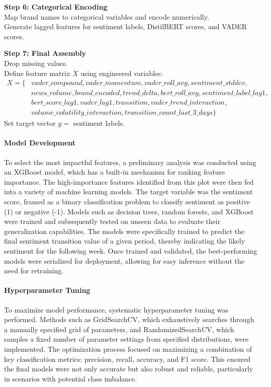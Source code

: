 \documentclass[pdflatex,sn-mathphys-num]{sn-jnl}%
\begin{document}
\begin{algorithm}[H]
\textbf{Step 6: Categorical Encoding} \\
\Indp
Map brand names to categorical variables and encode numerically. \\
Generate lagged features for sentiment labels, DistilBERT scores, and VADER scores. \\
\Indm

\textbf{Step 7: Final Assembly} \\
Drop missing values. \\
Define feature matrix $X$ using engineered variables:
\[
\begin{aligned}
X = \{ & vader\_compound, vader\_momentum, vader\_roll\_avg, sentiment\_stddev, \\
       &  news\_volume, brand\_encoded, trend\_delta, bert\_roll\_avg, sentiment\_label\_lag1, \\
       & bert\_score\_lag1,vader\_lag1, transition, vader\_trend\_interaction,  \\
       & volume\_volatility\_interaction,transition\_count\_last\_3\_days \}
\end{aligned}
\]
Set target vector $y =$ sentiment labels. \\
\Indm


\end{algorithm}

\paragraph{Model Development}
To select the most impactful features, a preliminary analysis was conducted using an XGBoost model, which has a built-in mechanism for ranking feature importance. The high-importance features identified from this plot were then fed into a variety of machine learning models. The target variable was the sentiment score, framed as a binary classification problem to classify sentiment as positive (1) or negative (-1). Models such as decision trees, random forests, and XGBoost were trained and subsequently tested on unseen data to evaluate their generalization capabilities. The models were specifically trained to predict the final sentiment transition value of a given period, thereby indicating the likely sentiment for the following week. Once trained and validated, the best-performing models were serialized for deployment, allowing for easy inference without the need for retraining.
\paragraph{Hyperparameter Tuning}
To maximize model performance, systematic hyperparameter tuning was performed. Methods such as GridSearchCV, which exhaustively searches through a manually specified grid of parameters, and RandomizedSearchCV, which samples a fixed number of parameter settings from specified distributions, were implemented. The optimization process focused on maximizing a combination of key classification metrics: precision, recall, accuracy, and F1 score. This ensured the final models were not only accurate but also robust and reliable, particularly in scenarios with potential class imbalance.
\end{document}
